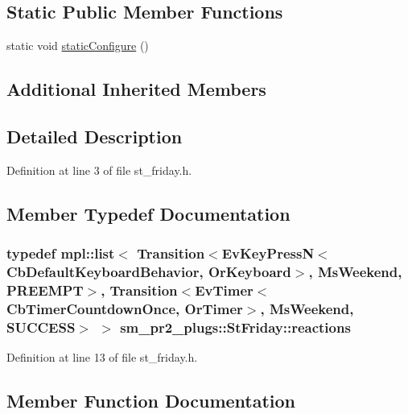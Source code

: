 \subsection*{Static Public Member Functions}
\begin{DoxyCompactItemize}
\item 
static void \hyperlink{structsm__pr2__plugs_1_1StFriday_aaa6e4ccc294db2208ad7cc22612e8fc3}{static\+Configure} ()
\end{DoxyCompactItemize}
\subsection*{Additional Inherited Members}


\subsection{Detailed Description}


Definition at line 3 of file st\+\_\+friday.\+h.



\subsection{Member Typedef Documentation}
\subsubsection[{\texorpdfstring{reactions}{reactions}}]{\setlength{\rightskip}{0pt plus 5cm}typedef mpl\+::list$<$ Transition$<$Ev\+Key\+PressN$<$Cb\+Default\+Keyboard\+Behavior, {\bf Or\+Keyboard}$>$, {\bf Ms\+Weekend}, {\bf P\+R\+E\+E\+M\+PT}$>$, Transition$<$Ev\+Timer$<$Cb\+Timer\+Countdown\+Once, {\bf Or\+Timer}$>$, {\bf Ms\+Weekend}, {\bf S\+U\+C\+C\+E\+SS}$>$ $>$ {\bf sm\+\_\+pr2\+\_\+plugs\+::\+St\+Friday\+::reactions}}\hypertarget{structsm__pr2__plugs_1_1StFriday_af7a1171c70541cd3d401c5885ef1a49e}{}\label{structsm__pr2__plugs_1_1StFriday_af7a1171c70541cd3d401c5885ef1a49e}


Definition at line 13 of file st\+\_\+friday.\+h.



\subsection{Member Function Documentation}
